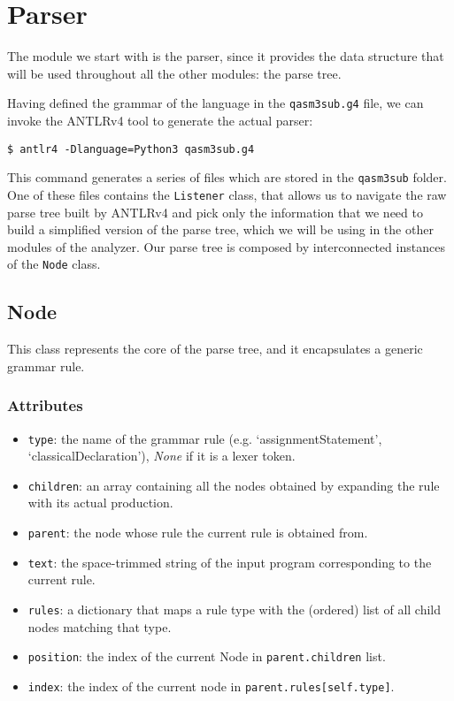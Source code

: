 \documentclass[12pt,a4paper]{report}
\theoremstyle{definition}
\theoremstyle{definition}
\theoremstyle{definition}
\begin{document}
\section{Parser}
The module we start with is the parser, since it provides the data structure that will be used throughout all the other modules: the parse tree.

Having defined the grammar of the language in the \texttt{qasm3sub.g4} file, we can invoke the ANTLRv4 tool \cite{antlr} to generate the actual parser:
\begin{lstlisting}
$ antlr4 -Dlanguage=Python3 qasm3sub.g4
\end{lstlisting}
This command generates a series of files which are stored in the \texttt{qasm3sub} folder. One of these files contains the \texttt{Listener} class, that allows us to navigate the raw parse tree built by ANTLRv4 and pick only the information that we need to build a simplified version of the parse tree, which we will be using in the other modules of the analyzer.
Our parse tree is composed by interconnected instances of the \texttt{Node} class.

\subsection{Node}
This class represents the core of the parse tree, and it encapsulates a generic grammar rule.
\subsubsection{Attributes}
\begin{itemize}
    \itemsep 0em
    \item \texttt{type}: the name of the grammar rule (e.g. `assignmentStatement', `classicalDeclaration'), \textit{None} if it is a lexer token.
    \item \texttt{children}: an array containing all the nodes obtained by expanding the rule with its actual production.
    \item \texttt{parent}: the node whose rule the current rule is obtained from.
    \item \texttt{text}: the space-trimmed string of the input program corresponding to the current rule.
    \item \texttt{rules}: a dictionary that maps a rule type with the (ordered) list of all child nodes matching that type.
    \item \texttt{position}: the index of the current Node in \texttt{parent.children} list.
    \item \texttt{index}: the index of the current node in \texttt{parent.rules[self.type]}.
\end{itemize}
\end{document}
